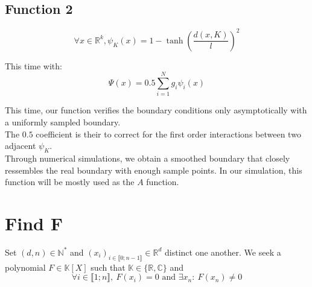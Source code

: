 \documentclass{article}
\theoremstyle{definition}
\theoremstyle{property}
\theoremstyle{remark}
\begin{document}
	\subsection{Function 2}
	\begin{equation*}
		\forall x \in \mathbb{R}^k, \psi_K(x)= 1 - \tanh \left( \frac{d(x,K)}{l} \right)^2
	\end{equation*}

	This time with:
	\begin{equation*}
		\Psi(x) = 0.5 \sum_{i=1}^{N}g_i\psi_i(x)
	\end{equation*}

	This time, our function verifies the boundary conditions only asymptotically with a uniformly sampled boundary.\\
	The $0.5$ coefficient is their to correct for the first order interactions between two adjacent $\psi_K$.\\
	Through numerical simulations, we obtain a smoothed boundary that closely ressembles the real boundary with enough sample points.
	In our simulation, this function will be mostly used as the $A$ function.

	\section{Find F}
	Set $(d,n)\in \mathbb{N}^*$ and $(x_i)_{i\in \llbracket0;n-1\rrbracket }\in \mathbb{R}^{d}$ distinct one another. We seek a polynomial $F\in\mathbb{K}[X]$ such that $\mathbb{K} \in \{\mathbb{R},\mathbb{C}\}$ and
	$$\forall i\in \llbracket1;n\rrbracket,~F(x_i)=0 \text{ and } \exists x_n:~F(x_n)\neq0$$
	
\end{document}
